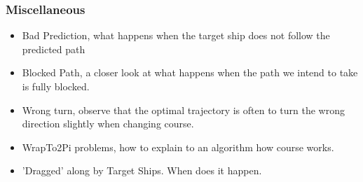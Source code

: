 \subsubsection{Miscellaneous}
\begin{itemize}
    \item Bad Prediction, what happens when the target ship does not follow the predicted path
    \item Blocked Path, a closer look at what happens when the path we intend to take is fully blocked.
    \item Wrong turn, observe that the optimal trajectory is often to turn the wrong direction slightly when changing course.
    \item WrapTo2Pi problems, how to explain to an algorithm how course works.
    \item 'Dragged' along by Target Ships. When does it happen.
\end{itemize}

